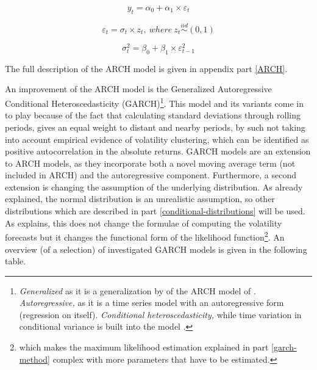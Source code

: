 \documentclass[a4paper, twoside]{templates/ociamthesis}
\begin{document}
\begin{equation} 
y_{t} = \alpha_0 + \alpha_1 \times \varepsilon_t
 \label{eq:eq1} 
\end{equation}
\vspace{-15mm}

\begin{equation}
\varepsilon_{t} = \sigma_t \times z_t, \ where \ z_t \stackrel{iid}{\sim} (0,1)
 \label{eq:eq2} 
\end{equation}
\vspace{-15mm}

\begin{equation}
\sigma_{t}^{2} = \beta_0 + \beta_1 \times  \varepsilon_{t-1}^2 
 \label{eq:eq3}
\end{equation}

The full description of the ARCH model is given in appendix part \ref{ARCH}.

\noindent An improvement of the ARCH model is the Generalized Autoregressive Conditional Heteroscedasticity (GARCH)\footnote{\emph{Generalized} as it is a generalization by \textcite{bollerslev1986} of the ARCH model of \textcite{engle1982}. \emph{Autoregressive,} as it is a time series model with an autoregressive form (regression on itself). \emph{Conditional heteroscedasticity,} while time variation in conditional variance is built into the model \autocite{alexander2008}.}. This model and its variants come in to play because of the fact that calculating standard deviations through rolling periods, gives an equal weight to distant and nearby periods, by such not taking into account empirical evidence of volatility clustering, which can be identified as positive autocorrelation in the absolute returns. GARCH models are an extension to ARCH models, as they incorporate both a novel moving average term (not included in ARCH) and the autoregressive component. Furthermore, a second extension is changing the assumption of the underlying distribution. As already explained, the normal distribution is an unrealistic assumption, so other distributions which are described in part \ref{conditional-distributions} will be used. As \textcite{alexander2008} explains, this does not change the formulae of computing the volatility forecasts but it changes the functional form of the likelihood function\footnote{which makes the maximum likelihood estimation explained in part \ref{garch-method} complex with more parameters that have to be estimated.}. An overview (of a selection) of investigated GARCH models is given in the following table.
\end{document}
